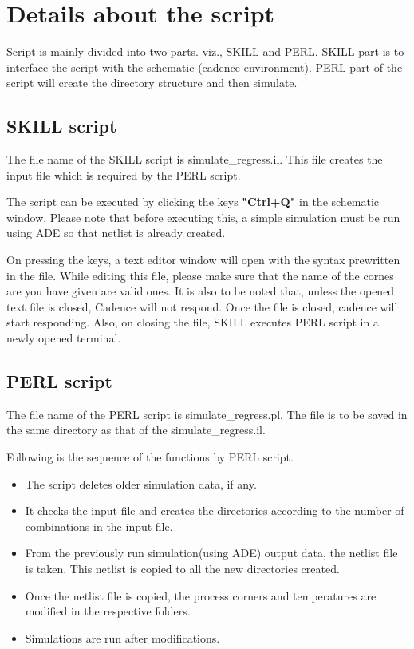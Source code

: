 \documentclass{article}
\begin{document}
\section{Details about the script}
Script is mainly divided into two parts. viz., SKILL and PERL. 
SKILL part is to interface the script with the schematic (cadence environment). 
PERL part of the script will create the directory structure and then simulate.
\subsection{SKILL script}
The file name of the SKILL script is simulate\_regress.il. 
This file creates the input file which is required by the PERL script. 

The script can be executed by clicking the keys \textbf{"Ctrl+Q"} in the schematic window. 
Please note that before executing this, a simple simulation must be run using ADE so that netlist is already created. 

On pressing the keys, a text editor window will open with the syntax prewritten in the file. 
While editing this file, please make sure that the name of the cornes are you have given are valid ones. 
It is also to be noted that, unless the opened text file is closed, Cadence will not respond. 
Once the file is closed, cadence will start responding. 
Also, on closing the file, SKILL executes PERL script in a newly opened terminal. 


\subsection{PERL script}
The file name of the PERL script is simulate\_regress.pl. The file is to be saved in the same directory as that of the simulate\_regress.il.

Following is the sequence of the functions by PERL script.
\begin{itemize}
\item The script deletes older simulation data, if any. 
\item It checks the input file and creates the directories according to the number of combinations in the input file.
\item From the previously run simulation(using ADE) output data, the netlist file is taken. This netlist is copied to all the new directories created.
\item Once the netlist file is copied, the process corners and temperatures are modified in the respective folders.
\item Simulations are run after modifications. 
\end{itemize}
\end{document}

